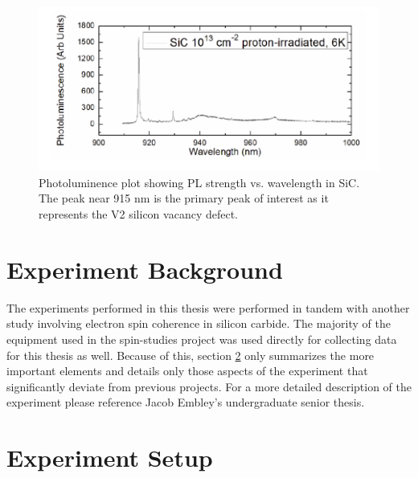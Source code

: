 \documentclass[oneside, noacknowlegments]{BYUPhys}
\begin{document}
\begin{figure}
    \centerline{\includegraphics{sic_pl_fig}}
    \caption[Photoluminence Spectra of Silicon Carbide]{\label{fig:SiCPL}
      Photoluminence plot showing PL strength vs. wavelength in SiC. The peak near 915 nm is the primary peak of interest as it represents the V2 silicon vacancy defect.}
 \end{figure}

\section{Experiment Background}

The experiments performed in this thesis were performed in tandem with another study involving electron spin coherence in silicon carbide. The majority of the equipment used in the spin-studies project was used directly for collecting data for this thesis as well. Because of this, section \ref{sec:Experiment} only summarizes the more important elements and details only those aspects of the experiment that significantly deviate from previous projects. For a more detailed description of the experiment please reference Jacob Embley's undergraduate senior thesis. \cite{RefWorks:doc:5892912ae4b0dec22aee3993}

\section{Experiment Setup}
\label{sec:Experiment}
\end{document}
